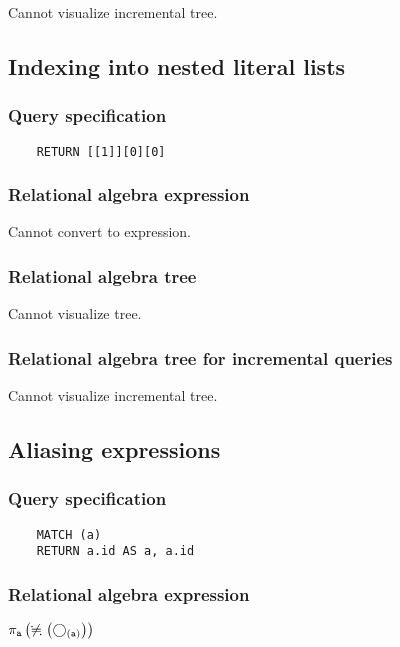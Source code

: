 	Cannot visualize incremental tree.
	\subsection{Indexing into nested literal lists}

	\subsubsection*{Query specification}

	\begin{lstlisting}
	RETURN [[1]][0][0]
	\end{lstlisting}


	\subsubsection*{Relational algebra expression}

	Cannot convert to expression.

	\subsubsection*{Relational algebra tree}

	Cannot visualize tree.

	\subsubsection*{Relational algebra tree for incremental queries}

	Cannot visualize incremental tree.
	\subsection{Aliasing expressions}

	\subsubsection*{Query specification}

	\begin{lstlisting}
	MATCH (a)
	RETURN a.id AS a, a.id
	\end{lstlisting}


	\subsubsection*{Relational algebra expression}

	$\projection{\var{a}} \left(\alldifferent{} \left(\getvertices{a}{}\right)\right)$

